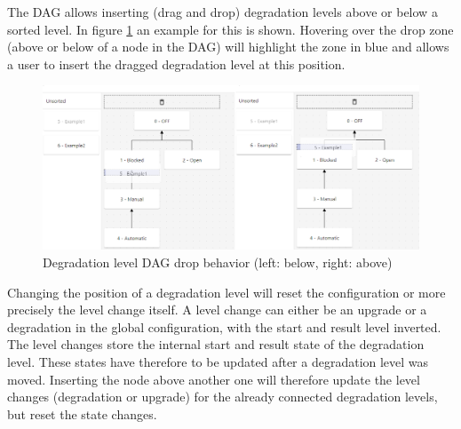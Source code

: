 The DAG allows inserting (drag and drop) degradation levels above or below a sorted level. In figure \ref{fig:degradation_level_tree_drop} an example for this is shown. Hovering over the drop zone (above or below of a node in the DAG) will highlight the zone in blue and allows a user to insert the dragged degradation level at this position. 

\begin{figure}[ht]
    \centering
    \includegraphics[width=\textwidth]{img/degradation_tree_drop.png}
    \caption{Degradation level DAG drop behavior (left: below, right: above)}
    \label{fig:degradation_level_tree_drop}
\end{figure}

\newpage

Changing the position of a degradation level will reset the configuration or more precisely the level change itself. A level change can either be an upgrade or a degradation in the global configuration, with the start and result level inverted. The level changes store the internal start and result state of the degradation level. These states have therefore to be updated after a degradation level was moved. Inserting the node above another one will therefore update the level changes (degradation or upgrade) for the already connected degradation levels, but reset the state changes.

